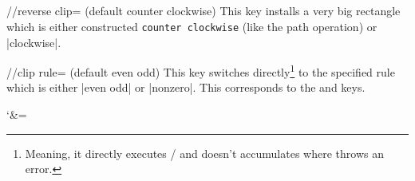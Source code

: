 \pagebreak
\subsection{\tikzname}
\begin{multicols}{2}
\begin{key}{/\tikzext/reverse clip= (default counter clockwise)}
This key installs a very big rectangle which is either constructed
\texttt{counter clockwise} (like the 
path operation) or |clockwise|.
\end{key}
\begin{key}{/\tikzext/clip rule= (default even odd)}
This key switches directly\footnote{%
  Meaning, it directly executes
  /%
  and doesn't accumulates where \tikzname\space
  throws an error.}
to the specified rule which is
either |even odd| or |nonzero|.
This corresponds to the  and
 keys.
\end{key}
\end{multicols}
\begingroup\catcode`\&=\active
\begin{codeexample}[preamble=\usetikzlibrary{ext.misc},width=6cm]
\newcommand*\myDiagram[1]{
  \fill[left color=blue, right color=green] (0, 0) rectangle (2, 1);
  \clip (1, .5) #1 [ext/reverse clip];
  \fill[left color=green, right color=blue] (0, 0) rectangle (2, 1);
}
\end{codeexample}
\endgroup
\endinput